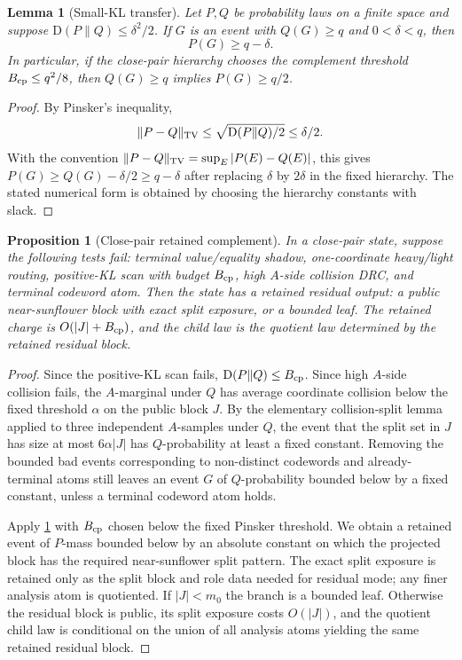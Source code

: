 \documentclass[11pt]{article}
\newcommand{\Cref}[1]{\ref{#1}}
\newtheorem{lemma}[theorem]{Lemma}
\newtheorem{proposition}[theorem]{Proposition}
\theoremstyle{remark}
\newcommand{\KL}{\mathrm D}
\begin{document}
\begin{lemma}[Small-KL transfer]\label{lem:bounded-kl-transfer}
Let $P,Q$ be probability laws on a finite space and suppose $\KL(P\|Q)\le \delta^2/2$.  If $G$ is an event with $Q(G)\ge q$ and $0<\delta<q$, then
\[
        P(G)\ge q-\delta.
\]
In particular, if the close-pair hierarchy chooses the complement threshold $B_{\rm cp}\le q^2/8$, then $Q(G)\ge q$ implies $P(G)\ge q/2$.
\end{lemma}

\begin{proof}
By Pinsker's inequality,
\[
        \|P-Q\|_{\rm TV}\le \sqrt{\KL(P\|Q)/2}\le \delta/2.
\]
With the convention $\|P-Q\|_{\rm TV}=\sup_E |P(E)-Q(E)|$, this gives $P(G)\ge Q(G)-\delta/2\ge q-\delta$ after replacing $\delta$ by $2\delta$ in the fixed hierarchy.  The stated numerical form is obtained by choosing the hierarchy constants with slack.
\end{proof}

\begin{proposition}[Close-pair retained complement]\label{prop:appendix-close-complement}
In a close-pair state, suppose the following tests fail: terminal value/equality shadow, one-coordinate heavy/light routing, positive-KL scan with budget $B_{\rm cp}$, high $A$-side collision DRC, and terminal codeword atom.  Then the state has a retained residual output: a public near-sunflower block with exact split exposure, or a bounded leaf.  The retained charge is $O(|J|+B_{\rm cp})$, and the child law is the quotient law determined by the retained residual block.
\end{proposition}

\begin{proof}
Since the positive-KL scan fails, $\KL(P\|Q)\le B_{\rm cp}$.  Since high $A$-side collision fails, the $A$-marginal under $Q$ has average coordinate collision below the fixed threshold $\alpha$ on the public block $J$.  By the elementary collision-split lemma applied to three independent $A$-samples under $Q$, the event that the split set in $J$ has size at most $6\alpha |J|$ has $Q$-probability at least a fixed constant.  Removing the bounded bad events corresponding to non-distinct codewords and already-terminal atoms still leaves an event $G$ of $Q$-probability bounded below by a fixed constant, unless a terminal codeword atom holds.

Apply \Cref{lem:bounded-kl-transfer} with $B_{\rm cp}$ chosen below the fixed Pinsker threshold.  We obtain a retained event of $P$-mass bounded below by an absolute constant on which the projected block has the required near-sunflower split pattern.  The exact split exposure is retained only as the split block and role data needed for residual mode; any finer analysis atom is quotiented.  If $|J|<m_0$ the branch is a bounded leaf.  Otherwise the residual block is public, its split exposure costs $O(|J|)$, and the quotient child law is conditional on the union of all analysis atoms yielding the same retained residual block.
\end{proof}
\end{document}
